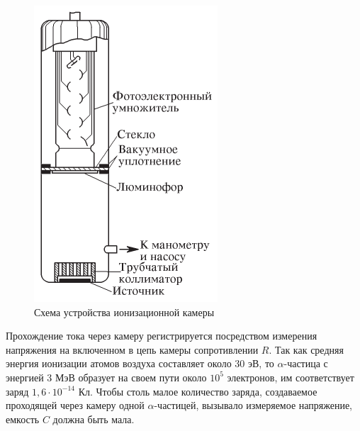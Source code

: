 \documentclass[a4paper,12pt]{article} %
\begin{document}
	\begin{figure}
		\includegraphics[width=\linewidth]{ustanovka2.pdf}
		\caption{Схема устройства ионизационной камеры}
		\label{ris Ion}
	\end{figure}
	
	Прохождение тока через камеру регистрируется посредством измерения напряжения на включенном в цепь камеры сопротивлении $ R $.
	Так как средняя энергия ионизации атомов воздуха составляет около 30 эВ, то $\alpha$-частица с энергией 3 МэВ образует на своем пути около $ 10^5 $ электронов, 
	им соответствует заряд $1,6 \cdot 10^{-14} $ Кл. Чтобы столь малое количество заряда, создаваемое проходящей через камеру одной $\alpha$-частицей, 
	вызывало измеряемое напряжение, емкость $ C $ должна быть мала.
	
\end{document}
